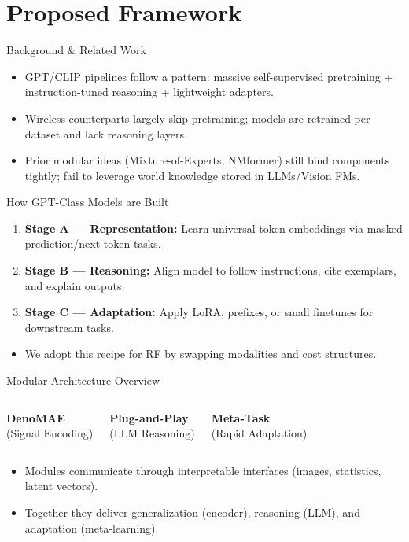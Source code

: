 \section{Proposed Framework}

\begin{frame}{Background \& Related Work}
    \begin{itemize}
        \item GPT/CLIP pipelines follow a pattern: massive self-supervised pretraining + instruction-tuned reasoning + lightweight adapters.
        \item Wireless counterparts largely skip pretraining; models are retrained per dataset and lack reasoning layers.
        \item Prior modular ideas (Mixture-of-Experts, NMformer) still bind components tightly; fail to leverage world knowledge stored in LLMs/Vision FMs.
    \end{itemize}
\end{frame}

\begin{frame}{How GPT-Class Models are Built}
    \begin{enumerate}
        \item \textbf{Stage A — Representation:} Learn universal token embeddings via masked prediction/next-token tasks.
        \item \textbf{Stage B — Reasoning:} Align model to follow instructions, cite exemplars, and explain outputs.
        \item \textbf{Stage C — Adaptation:} Apply LoRA, prefixes, or small finetunes for downstream tasks.
    \end{enumerate}
    \begin{itemize}
        \item We adopt this recipe for RF by swapping modalities and cost structures.
    \end{itemize}
\end{frame}

\begin{frame}{Modular Architecture Overview}
    \begin{columns}
        \textbf{DenoMAE}\\(Signal Encoding)
        
        \textbf{Plug-and-Play}\\(LLM Reasoning)
        
        \textbf{Meta-Task}\\(Rapid Adaptation)
    \end{columns}
    \begin{itemize}
        \item Modules communicate through interpretable interfaces (images, statistics, latent vectors).
        \item Together they deliver generalization (encoder), reasoning (LLM), and adaptation (meta-learning).
    \end{itemize}
\end{frame}

